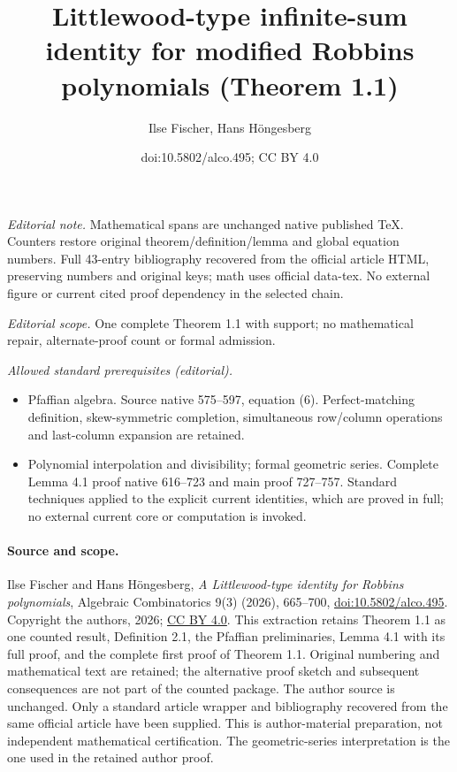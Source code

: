 \documentclass[10pt,a4paper]{article}
\title{Littlewood-type infinite-sum identity for modified Robbins polynomials (Theorem 1.1)}
\author{Ilse Fischer, Hans Höngesberg}
\date{doi:10.5802/alco.495; CC BY 4.0}
\theoremstyle{definition}
\begin{document}
\maketitle
\noindent\textit{Editorial note.} Mathematical spans are unchanged native published TeX. Counters restore original theorem/definition/lemma and global equation numbers. Full 43-entry bibliography recovered from the official article HTML, preserving numbers and original keys; math uses official data-tex. No external figure or current cited proof dependency in the selected chain.\par\medskip
\noindent\textit{Editorial scope.} One complete Theorem 1.1 with support; no mathematical repair, alternate-proof count or formal admission.\par\medskip
\noindent\textit{Allowed standard prerequisites (editorial).}\begin{itemize}
\item Pfaffian algebra. Source native 575–597, equation (6). Perfect-matching definition, skew-symmetric completion, simultaneous row/column operations and last-column expansion are retained.
\item Polynomial interpolation and divisibility; formal geometric series. Complete Lemma 4.1 proof native 616–723 and main proof 727–757. Standard techniques applied to the explicit current identities, which are proved in full; no external current core or computation is invoked.
\end{itemize}\medskip
\paragraph{Source and scope.} Ilse Fischer and Hans H\"ongesberg, \emph{A Littlewood-type identity for Robbins polynomials}, Algebraic Combinatorics 9(3) (2026), 665--700, \href{https://doi.org/10.5802/alco.495}{doi:10.5802/alco.495}. Copyright the authors, 2026; \href{https://creativecommons.org/licenses/by/4.0/}{CC BY 4.0}.
This extraction retains Theorem 1.1 as one counted result, Definition 2.1, the Pfaffian preliminaries, Lemma 4.1 with its full proof, and the complete first proof of Theorem 1.1. Original numbering and mathematical text are retained; the alternative proof sketch and subsequent consequences are not part of the counted package.
The author source is unchanged. Only a standard article wrapper and bibliography recovered from the same official article have been supplied. This is author-material preparation, not independent mathematical certification. The geometric-series interpretation is the one used in the retained author proof.
\end{document}
